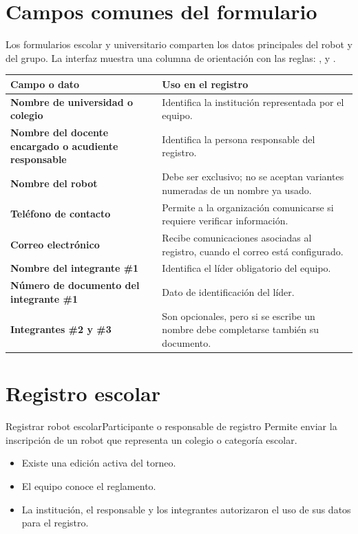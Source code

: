 \section{Campos comunes del formulario}

Los formularios escolar y universitario comparten los datos principales del robot y del grupo. La interfaz muestra una columna de orientación con las reglas: ,  y .

\begin{tabularx}{\linewidth}{>{\bfseries}p{4.2cm}X}
\toprule
Campo o dato & Uso en el registro\\
\midrule
Nombre de universidad o colegio & Identifica la institución representada por el equipo.\\
Nombre del docente encargado o acudiente responsable & Identifica la persona responsable del registro.\\
Nombre del robot & Debe ser exclusivo; no se aceptan variantes numeradas de un nombre ya usado.\\
Teléfono de contacto & Permite a la organización comunicarse si requiere verificar información.\\
Correo electrónico & Recibe comunicaciones asociadas al registro, cuando el correo está configurado.\\
Nombre del integrante \#1 & Identifica el líder obligatorio del equipo.\\
Número de documento del integrante \#1 & Dato de identificación del líder.\\
Integrantes \#2 y \#3 & Son opcionales, pero si se escribe un nombre debe completarse también su documento.\\
\bottomrule
\end{tabularx}

\section{Registro escolar}

\begin{procedimiento}{Registrar robot escolar}{Participante o responsable de registro}
Permite enviar la inscripción de un robot que representa un colegio o categoría escolar.
\end{procedimiento}

\begin{precondiciones}
\begin{itemize}
    \item Existe una edición activa del torneo.
    \item El equipo conoce el reglamento.
    \item La institución, el responsable y los integrantes autorizaron el uso de sus datos para el registro.
\end{itemize}
\end{precondiciones}


